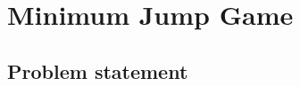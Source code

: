 \chapter{Minimum Jump Game}\label{ch:minimumjumpgame}
\section{Problem statement}\label{sec:problemStatement}

\begin{minipage}{\linewidth}
    
\end{minipage}

\begin{minipage}{\linewidth}
    
\end{minipage}
